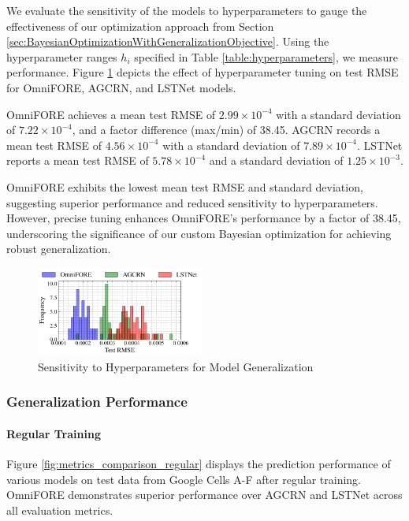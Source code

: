 We evaluate the sensitivity of the models to hyperparameters to gauge the effectiveness of our optimization approach from Section \ref{sec:BayesianOptimizationWithGeneralizationObjective}. Using the hyperparameter ranges $h_i$ specified in Table \ref{table:hyperparameters}, we measure performance. Figure \ref{fig:test_rmse_distribution_histogram} depicts the effect of hyperparameter tuning on test RMSE for OmniFORE, AGCRN, and LSTNet models.

OmniFORE achieves a mean test RMSE of $2.99 \times 10^{-4}$ with a standard deviation of $7.22 \times 10^{-4}$, and a factor difference (max/min) of 38.45. AGCRN records a mean test RMSE of $4.56 \times 10^{-4}$ with a standard deviation of $7.89 \times 10^{-4}$. LSTNet reports a mean test RMSE of $5.78 \times 10^{-4}$ and a standard deviation of $1.25 \times 10^{-3}$.

OmniFORE exhibits the lowest mean test RMSE and standard deviation, suggesting superior performance and reduced sensitivity to hyperparameters. However, precise tuning enhances OmniFORE's performance by a factor of 38.45, underscoring the significance of our custom Bayesian optimization for achieving robust generalization.

\begin{figure}%
\centering
\includegraphics[width=0.49\textwidth]{img/test_rmse_distribution_histogram.pdf}
\caption{Sensitivity to Hyperparameters for Model Generalization}
\label{fig:test_rmse_distribution_histogram}
\end{figure}

\subsubsection{\textbf{Generalization Performance}}
\label{sec: Evaluation - Generalization Performance}
\paragraph*{Regular Training}
Figure \ref{fig:metrics_comparison_regular} displays the prediction performance of various models on test data from Google Cells A-F after regular training. OmniFORE demonstrates superior performance over AGCRN and LSTNet across all evaluation metrics.

